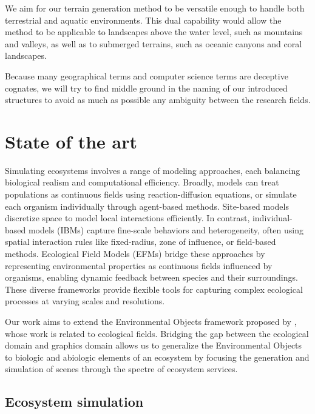 We aim for our terrain generation method to be versatile enough to handle both terrestrial and aquatic environments. This dual capability would allow the method to be applicable to landscapes above the water level, such as mountains and valleys, as well as to submerged terrains, such as oceanic canyons and coral landscapes.

Because many geographical terms and computer science terms are deceptive cognates, we will try to find middle ground in the naming of our introduced structures to avoid as much as possible any ambiguity between the research fields.

\section{State of the art}
\label{sec:env-obj_related-works}

Simulating ecosystems involves a range of modeling approaches, each balancing biological realism and computational efficiency. Broadly, models can treat populations as continuous fields using reaction-diffusion equations, or simulate each organism individually through agent-based methods. Site-based models discretize space to model local interactions efficiently. In contrast, individual-based models (IBMs) capture fine-scale behaviors and heterogeneity, often using spatial interaction rules like fixed-radius, zone of influence, or field-based methods. Ecological Field Models (EFMs) bridge these approaches by representing environmental properties as continuous fields influenced by organisms, enabling dynamic feedback between species and their surroundings. These diverse frameworks provide flexible tools for capturing complex ecological processes at varying scales and resolutions.

Our work aims to extend the Environmental Objects framework proposed by \citep{Grosbellet2016}, whose work is related to ecological fields. Bridging the gap between the ecological domain and graphics domain allows us to generalize the Environmental Objects to biologic and abiologic elements of an ecosystem by focusing the generation and simulation of scenes through the spectre of ecosystem services.

\subsection{Ecosystem simulation}

